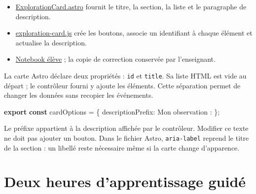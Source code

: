 \documentclass[
  canadien,
  11pt,
  a4paper,
]{report}
\newenvironment{Shaded}{}{}
\newcommand{\DataTypeTok}[1]{\textcolor[rgb]{0.56,0.13,0.00}{#1}}
\newcommand{\ImportTok}[1]{\textcolor[rgb]{0.00,0.50,0.00}{\textbf{#1}}}
\newcommand{\KeywordTok}[1]{\textcolor[rgb]{0.00,0.44,0.13}{\textbf{#1}}}
\newcommand{\NormalTok}[1]{#1}
\newcommand{\OperatorTok}[1]{\textcolor[rgb]{0.40,0.40,0.40}{#1}}
\newcommand{\StringTok}[1]{\textcolor[rgb]{0.25,0.44,0.63}{#1}}
\providecommand{\tightlist}{%
  \setlength{\itemsep}{0pt}\setlength{\parskip}{0pt}}
\begin{document}
\begin{itemize}
\tightlist
\item
  \href{../../frontend/module-2/ExplorationCard.astro}{ExplorationCard.astro}
  fournit le titre, la section, la liste et le paragraphe de
  description.
\item
  \href{../../frontend/module-2/exploration-card.js}{exploration-card.js}
  crée les boutons, associe un identifiant à chaque élément et actualise
  la description.
\item
  \href{../../notebooks/module-2.ipynb}{Notebook élève} ; la copie de
  correction conservée par l'enseignant.
\end{itemize}

La carte Astro déclare deux propriétés : \texttt{id} et \texttt{title}.
Sa liste HTML est vide au départ ; le contrôleur fourni y ajoute les
éléments. Cette séparation permet de changer les données sans recopier
les événements.

\begin{Shaded}
\begin{Highlighting}[]
\ImportTok{export} \KeywordTok{const}\NormalTok{ cardOptions }\OperatorTok{=}\NormalTok{ \{ }\DataTypeTok{descriptionPrefix}\OperatorTok{:} \StringTok{\textquotesingle{}Mon observation : \textquotesingle{}}\NormalTok{ \}}\OperatorTok{;}
\end{Highlighting}
\end{Shaded}

Le préfixe appartient à la description affichée par le contrôleur.
Modifier ce texte ne doit pas ajouter un bouton. Dans le fichier Astro,
\texttt{aria-label} reprend le titre de la section : un libellé reste
nécessaire même si la carte change d'apparence.

\section{Deux heures d'apprentissage
guidé}\label{deux-heures-dapprentissage-guiduxe9-1}
\end{document}
